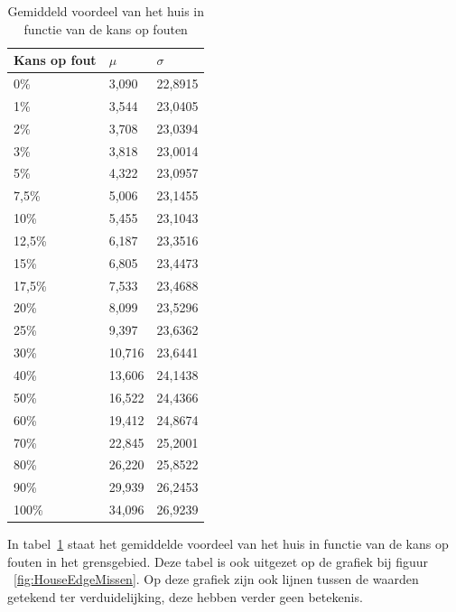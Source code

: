 \documentclass[conference]{IEEEtran}
\begin{document}
\begin{table}[H]
\centering
\begin{tabular}{|l|l|l|}
\hline
Kans op fout & $\mu$ & $\sigma$\\
\hline
0\% & 3,090 & 22,8915\\
1\% & 3,544 & 23,0405\\
2\% & 3,708 & 23,0394\\
3\% & 3,818 & 23,0014\\
5\% & 4,322 & 23,0957\\
7,5\% & 5,006 & 23,1455\\
10\% & 5,455 & 23,1043\\
12,5\% & 6,187 & 23,3516\\
15\% & 6,805 & 23,4473\\
17,5\% & 7,533 & 23,4688\\
20\% & 8,099 & 23,5296\\
25\% & 9,397 & 23,6362\\
30\% & 10,716 & 23,6441\\
40\% & 13,606 & 24,1438\\
50\% & 16,522 & 24,4366\\
60\% & 19,412 & 24,8674\\
70\% & 22,845 & 25,2001\\
80\% & 26,220 & 25,8522\\
90\% & 29,939 & 26,2453\\
100\% & 34,096 & 26,9239\\
\hline
\end{tabular}
\caption{Gemiddeld voordeel van het huis in functie van de kans op fouten}
\label{tab:gemiddeldesMiskansen}
\end{table}

In tabel~\ref{tab:gemiddeldesMiskansen} staat het gemiddelde voordeel van het huis in functie van de kans op fouten in het grensgebied. Deze tabel is ook uitgezet op de grafiek bij figuur ~\ref{fig:HouseEdgeMissen}. Op deze grafiek zijn ook lijnen tussen de waarden getekend ter verduidelijking, deze hebben verder geen betekenis.
\end{document}
